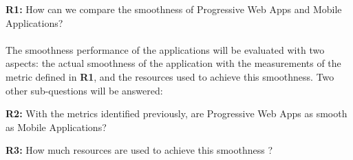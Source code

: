 \documentclass{kththesis}
\begin{document}
\textbf{R1:} How can we compare the smoothness of Progressive Web Apps and Mobile Applications?

\paragraph{}
The smoothness performance of the applications will be evaluated with two aspects: the actual smoothness of the application with the measurements of the metric defined in \textbf{R1}, and the resources used to achieve this smoothness. Two other sub-questions will be answered: \newline

\textbf{R2:} With the metrics identified previously, are Progressive Web Apps as smooth as Mobile Applications? \newline

\medskip

\textbf{R3:} How much resources are used to achieve this smoothness ?

\end{document}
